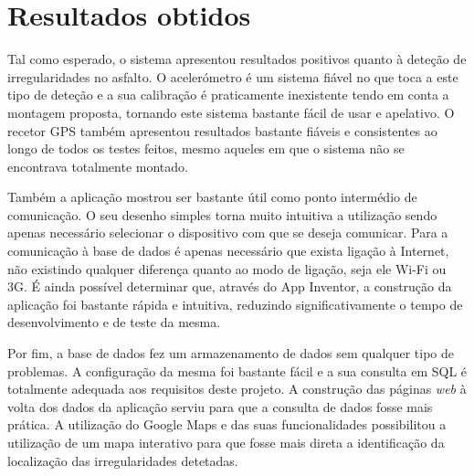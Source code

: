 \section{Resultados obtidos}
\label{sec:resultados}

Tal como esperado, o sistema apresentou resultados positivos quanto à deteção de irregularidades no asfalto.
O acelerómetro é um sistema fiável no que toca a este tipo de deteção e a sua calibração é praticamente inexistente tendo em conta a montagem proposta, tornando este sistema bastante fácil de usar e apelativo.
O recetor GPS também apresentou resultados bastante fiáveis e consistentes ao longo de todos os testes feitos, mesmo aqueles em que o sistema não se encontrava totalmente montado.

Também a aplicação mostrou ser bastante útil como ponto intermédio de comunicação.
O seu desenho simples torna muito intuitiva a utilização sendo apenas necessário selecionar o dispositivo com que se deseja comunicar.
Para a comunicação à base de dados é apenas necessário que exista ligação à Internet, não existindo qualquer diferença quanto ao modo de ligação, seja ele Wi-Fi ou 3G.
É ainda possível determinar que, através do App Inventor, a construção da aplicação foi bastante rápida e intuitiva, reduzindo significativamente o tempo de desenvolvimento e de teste da mesma.

Por fim, a base de dados fez um armazenamento de dados sem qualquer tipo de problemas.
A configuração da mesma foi bastante fácil e a sua consulta em SQL é totalmente adequada aos requisitos deste projeto.
A construção das páginas \emph{web} à volta dos dados da aplicação serviu para que a consulta de dados fosse mais prática.
A utilização do Google Maps e das suas funcionalidades possibilitou a utilização de um mapa interativo para que fosse mais direta a identificação da localização das irregularidades detetadas.